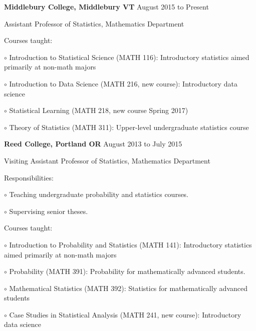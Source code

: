 \documentclass[10pt]{article}
\newcommand{\halfblankline}{\quad\vspace{-0.5\baselineskip}\pagebreak[3]}
\begin{document}
\textbf{Middlebury College, Middlebury VT} \hfill {August 2015 to Present}
\begin{outerlist}
    \item[] Assistant Professor of Statistics, Mathematics Department
    	\begin{innerlist}
		\item Courses taught:
		\begin{innerlist}
		\item[$\circ$] Introduction to Statistical Science (MATH 116):  Introductory
		statistics aimed primarily at non-math majors
		\item[$\circ$] Introduction to Data Science (MATH 216, new course): Introductory data science
		\item[$\circ$] Statistical Learning (MATH 218, new course Spring 2017)
		\item[$\circ$] Theory of Statistics (MATH 311): Upper-level undergraduate
		statistics course
		\end{innerlist}
	\end{innerlist}
\end{outerlist}

\halfblankline

\textbf{Reed College, Portland OR} \hfill {August 2013 to July 2015}
\begin{outerlist}
    \item[] Visiting Assistant Professor of Statistics, Mathematics Department
    \begin{innerlist}
        \item Responsibilities:
		\begin{innerlist}
		\item[$\circ$] Teaching undergraduate probability and statistics courses.
		\item[$\circ$] Supervising senior theses.
		\end{innerlist}
		\item Courses taught:
		\begin{innerlist}
		\item[$\circ$] Introduction to Probability and Statistics (MATH 141):  Introductory
		statistics aimed primarily at non-math majors
		\item[$\circ$] Probability (MATH 391): Probability for mathematically
		advanced students.
		\item[$\circ$] Mathematical Statistics (MATH 392): Statistics for mathematically
		 advanced students
		\item[$\circ$] Case Studies in Statistical Analysis (MATH 241, new course):  Introductory
		data science
	\end{innerlist}
    \end{innerlist}
\end{outerlist}
\end{document}
